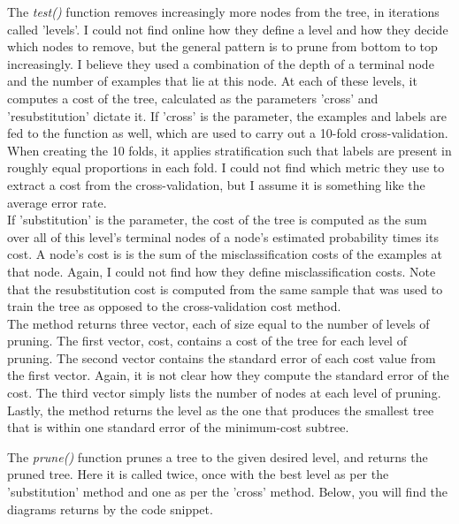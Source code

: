 The \emph{test()} function removes increasingly more nodes from the tree, in iterations called 'levels'.
I could not find online how they define a level and how they decide which nodes to remove,
but the general pattern is to prune from bottom to top increasingly.
I believe they used a combination of the depth of a terminal node and the number of examples that lie at this node.
At each of these levels, it computes a cost of the tree, calculated as the parameters 'cross' and 'resubstitution' dictate it.
If 'cross' is the parameter, the examples and labels are fed to the function as well, which are used to carry out a 10-fold
cross-validation. When creating the 10 folds, it applies stratification such that labels are present in roughly equal proportions
in each fold. I could not find which metric they use to extract a cost from the cross-validation, but I assume it is something
like the average error rate.\\
If 'substitution' is the parameter, the cost of the tree is computed as the sum over all of this level's terminal
nodes of a node's estimated probability times its cost.
A node's cost is is the sum of the misclassification costs of the examples at that node.
Again, I could not find how they define misclassification costs.
Note that the resubstitution cost is computed from the same sample that was used to train the tree as opposed to the cross-validation
cost method.\\
The method returns three vector, each of size equal to the number of levels of pruning. The first vector, cost, contains a cost
of the tree for each level of pruning. The second vector contains the standard error of each cost value from the first vector.
Again, it is not clear how they compute the standard error of the cost. The third vector simply lists the number of nodes at each
level of pruning. Lastly, the method returns the level as the one that produces the smallest tree that is within one standard
error of the minimum-cost subtree.

The \emph{prune()} function prunes a tree to the given desired level, and returns the pruned tree.
Here it is called twice, once with the best level as per the 'substitution' method and one as per the 'cross' method.
Below, you will find the diagrams returns by the code snippet.



